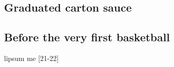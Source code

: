 

\begin{englishtext}

    \chapter[Graduated]{Graduated carton sauce}

    \begin{flushright}

    \end{flushright}

    \section{Before the very first basketball}

    lipsum me [21-22]

    \newpage

\end{englishtext}

